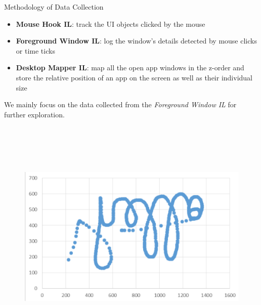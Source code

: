 \documentclass[final]{beamer}
\newlength{\colwidth}
\begin{document}
\begin{frame}[t]
\begin{columns}[t]
\begin{column}{\colwidth}
\begin{alertblock}{\LARGE{Methodology of Data Collection}}
{\begin{itemize}
      \item \textbf{Mouse Hook IL}: track the UI objects clicked by the mouse

      \item \textbf{Foreground Window IL}: log the window's details detected by mouse clicks or time ticks

      \item \textbf{Desktop Mapper IL}: map all the open app windows in the z-order and store the relative position of an app on the screen as well as their individual size
    
    \end{itemize}

    We mainly focus on the data collected from the \textit{Foreground Window IL} for further exploration. }
    \begin{figure}
      \includegraphics[width=0.475 \textwidth, height=11.5cm]{mouse_movement.png}
        \hspace{\fill}

\end{figure}
\end{alertblock}
\end{column}
\end{columns}
\end{frame}
\end{document}
